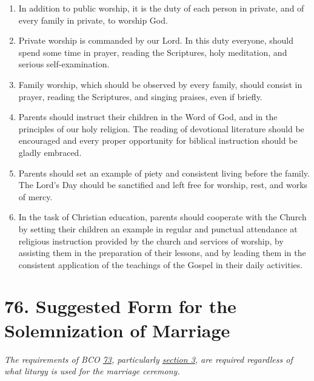 \documentclass[
]{book}
\providecommand{\tightlist}{%
  \setlength{\itemsep}{0pt}\setlength{\parskip}{0pt}}
\begin{document}
\begin{enumerate}
\def\labelenumi{\arabic{enumi}.}
\tightlist
\item
  \protect\hypertarget{75}{\href{}{}}In addition to public worship, it is the duty of each person in private, and of every family in private, to worship God.
\item
  Private worship is commanded by our Lord. In this duty everyone, should spend some time in prayer, reading the Scriptures, holy meditation, and serious self-examination.
\item
  Family worship, which should be observed by every family, should consist in prayer, reading the Scriptures, and singing praises, even if briefly.
\item
  Parents should instruct their children in the Word of God, and in the principles of our holy religion. The reading of devotional literature should be encouraged and every proper opportunity for biblical instruction should be gladly embraced.
\item
  Parents should set an example of piety and consistent living before the family. The Lord's Day should be sanctified and left free for worship, rest, and works of mercy.
\item
  In the task of Christian education, parents should cooperate with the Church by setting their children an example in regular and punctual attendance at religious instruction provided by the church and services of worship, by assisting them in the preparation of their lessons, and by leading them in the consistent application of the teachings of the Gospel in their daily activities.
\end{enumerate}

\hypertarget{suggested-form-for-the-solemnization-of-marriage}{%
\section*{76. Suggested Form for the Solemnization of Marriage}\label{suggested-form-for-the-solemnization-of-marriage}}

\protect\hypertarget{chapter-slug-76-suggested-form-for-the-solemnization-of-marriage}{\href{}{}}

\protect\hypertarget{76}{\href{}{}}\emph{The requirements of BCO \protect\hyperlink{73}{73}, particularly \protect\hyperlink{73.3}{section 3}, are required regardless of what liturgy is used for the marriage ceremony.}
\end{document}
